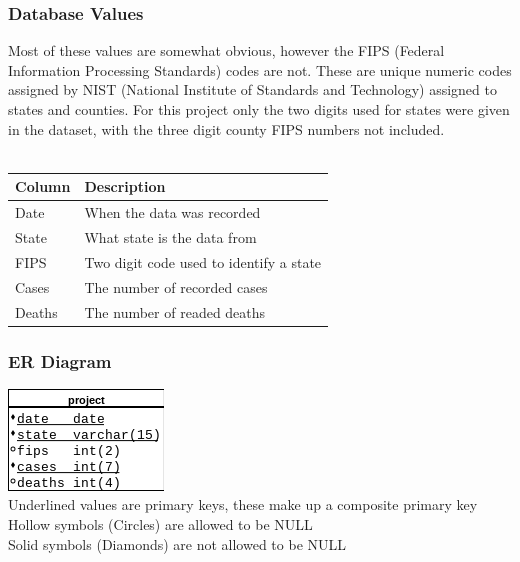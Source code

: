 \documentclass{article}
\begin{document}
\subsubsection{Database Values}
\noindent
Most of these values are somewhat obvious, however the FIPS (Federal Information Processing Standards) codes are not. 
These are unique numeric codes assigned by NIST (National Institute of Standards and Technology) assigned to states 
and counties. For this project only the two digits used for states were given in the dataset, with 
the three digit county FIPS numbers not included. \\ \\
\begin{tabular}{|l|l|}
	\hline
	Column & Description \\
	\hline
	Date & When the data was recorded \\
	\hline
	State & What state is the data from\\
	\hline
	FIPS & Two digit code used to identify a state \\
	\hline
	Cases & The number of recorded cases \\
	\hline
	Deaths & The number of readed deaths \\
	\hline
\end{tabular}

\subsubsection{ER Diagram}
\noindent
\includegraphics[scale=1]{erdiagram.png} \\
Underlined values are primary keys, these make up a composite primary key \\
Hollow symbols (Circles) are allowed to be NULL \\
Solid symbols (Diamonds) are not allowed to be NULL
\end{document}
